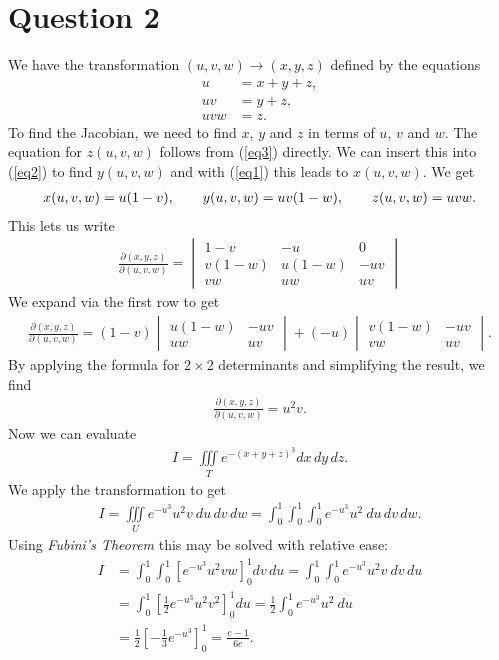\documentclass{article}
\newcommand{\ti}{\iiint\limits}
\newcommand{\hs}{\hspace{0.7cm}}
\begin{document}
\section*{Question 2}
We have the transformation $(u,v,w)\to(x,y,z)$ defined by the equations
\begin{align}
  \label{eq1}
  u &= x + y + z, \\
  \label{eq2}
  uv &= y + z,\\
  \label{eq3}
  uvw &= z.
\end{align}
To find the Jacobian, we need to find $x$, $y$ and $z$ in terms of $u$, $v$ and $w$.
The equation for $z(u,v,w)$ follows from (\ref{eq3}) directly. 
We can insert this into (\ref{eq2}) to find
$y(u,v,w)$ and with (\ref{eq1}) this leads to $x(u,v,w)$. We get
\begin{align*}
  x(u,v,w) = u(1-v),\hs
  y(u,v,w) = uv(1-w),\hs
  z(u,v,w) = uvw.
\end{align*}
This lets us write 
\begin{align*}
  \frac{\partial(x,y,z)}{\partial(u,v,w)}
  = \begin{vmatrix}
    1-v & -u & 0\\
    v(1-w) & u(1-w) & -uv\\
    vw & uw & uv
  \end{vmatrix}
\end{align*}
We expand via the first row to get
\begin{align*}
  \frac{\partial(x,y,z)}{\partial(u,v,w)}
  = (1-v)\begin{vmatrix}
    u(1-w) &-uv\\
    uw &uv
  \end{vmatrix}
  + (-u)\begin{vmatrix}
    v(1-w) &-uv\\
    vw & uv
  \end{vmatrix}.
\end{align*}
By applying the formula for $2\times 2$ determinants and
simplifying the result, we find
\begin{align*}
  \frac{\partial(x,y,z)}{\partial(u,v,w)} = u^2 v.
\end{align*}
Now we can evaluate
\begin{align*}
  I = \ti_T e^{-(x+y+z)^3}dx\,dy\,dz.
\end{align*}
We apply the transformation to get
\begin{align*}
  I = \ti_U e^{-u^3}u^2v\:du\,dv\,dw
  = \int_0^1\int_0^1\int_0^1 e^{-u^3}u^2\:du\,dv\,dw.
\end{align*}
Using \emph{Fubini's Theorem} this may be solved with relative ease:
\begin{align*}
  I &= \int_0^1 \int_0^1 \left[e^{-u^3}u^2 v w\right]_0^1dv\,du
  =\int_0^1 \int_0^1 e^{-u^3}u^2 v\:dv\,du\\
  &=\int_0^1 \left[\frac{1}{2}e^{-u^3}u^2v^2\right]_0^1du
  =\frac{1}{2}\int_0^1 e^{-u^3}u^2\:du\\
  &=\frac{1}{2}\left[-\frac{1}{3}e^{-u^3}\right]_0^1
  =\frac{e-1}{6e}.
\end{align*}
\end{document}
